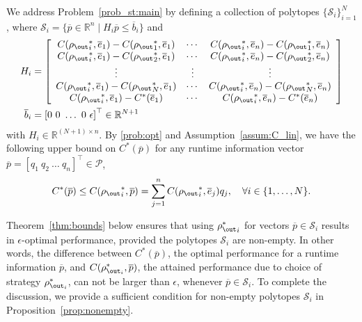 We address Problem~\ref{prob_st:main} by defining a collection of polytopes $\{\mathcal{S}_i\}_{i=1}^N$, where $\mathcal{S}_i= \{ \overline{p} \in \mathbb{R}^n \mid H_i \overline{p}\leq
\overline{b}_i\}$ and
{\small\begin{align}
    H_i &= \left[
        \begin{array}{ccc}
            C({\rho_\out}_i^\ast, \overline{e}_1) -
            C({\rho_\out}_1^\ast, \overline{e}_1) &
            \cdots &
            C({\rho_\out}_i^\ast, \overline{e}_n) -
            C({\rho_\out}_1^\ast, \overline{e}_n)\\
            C({\rho_\out}_i^\ast, \overline{e}_1) -
            C({\rho_\out}_2^\ast, \overline{e}_1) &
            \cdots &
            C({\rho_\out}_i^\ast, \overline{e}_n) -
            C({\rho_\out}_2^\ast, \overline{e}_n)\\
            \vdots & \vdots & \vdots \\
            C({\rho_\out}_i^\ast, \overline{e}_1) -
            C({\rho_\out}_N^\ast, \overline{e}_1) &
            \cdots &
            C({\rho_\out}_i^\ast, \overline{e}_n) -
            C({\rho_\out}_N^\ast, \overline{e}_n)\\
            C({\rho_\out}_i^\ast, \overline{e}_1) -
            C^\ast(\overline{e}_1) &
            \cdots &
            C({\rho_\out}_i^\ast, \overline{e}_n) -
            C^\ast(\overline{e}_n)
    \end{array}\right] \label{eq:A_defn} \\
        \overline{b}_i&={[0\ 0\ \ldots\ 0\
        \epsilon]}^\top\in \mathbb{R}^{N+1}\label{eq:b_defn}
\end{align}}\normalsize%
with $H_i\in \mathbb{R}^{(N+1)\times n}$. By \eqref{prob:opt} and Assumption~\ref{assum:C_lin}, we have the following upper bound on $C^\ast(\overline{p})$ for any runtime information vector $ \overline{p}={[q_1\ q_2\ \ldots\ q_n]}^\top\in
\mathcal{P}$,
\begin{align}
    C^\ast( \overline{p})\leq
    C({\rho_\out}_i^\ast,
    \overline{p})=\sum_{j=1}^nC({\rho_\out}_i^\ast,
    \overline{e}_j)q_j\label{eq:C_ub},\quad \forall
    i\in\{1,\ldots,N\}.
\end{align}

Theorem~\ref{thm:bounds} below ensures that using ${\rho_\out^\ast}_i$ for vectors $\overline p \in \mathcal{S}_i$ results in $\epsilon$-optimal performance, provided the polytopes $\mathcal{S}_i$ are non-empty. In other words, the difference between $C^\ast(\overline p)$, the optimal performance for a runtime information $\overline{p}$,  and $C(\rho_{\out_i}^\ast, \overline p)$, the attained performance due to choice of strategy $\rho_{\out_i}^\ast$,  can not be larger than $\epsilon$, whenever $\overline p \in \mathcal{S}_i$. To complete the discussion, we provide a sufficient condition for non-empty polytopes $\mathcal{S}_i$ in Proposition~\ref{prop:nonempty}.
 
